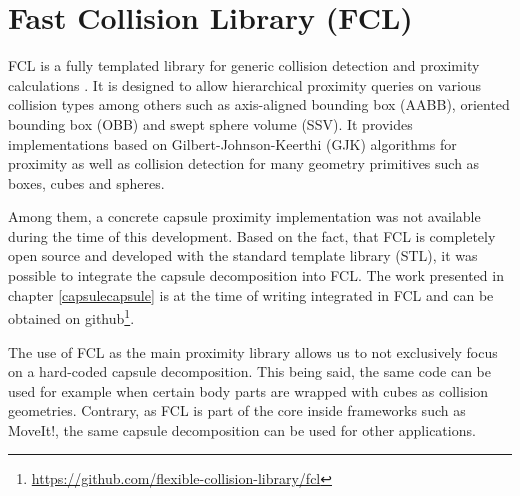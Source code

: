 \section{Fast Collision Library (FCL)}
FCL is a fully templated library for generic collision detection and proximity calculations \cite{conf/icra/PanCM12}. It is designed to allow hierarchical proximity queries on various collision types among others such as axis-aligned bounding box (AABB), oriented bounding box (OBB) and swept sphere volume (SSV). It provides implementations based on Gilbert-Johnson-Keerthi (GJK) \cite{VandenBergen:1999:FRG:334709.334711} \cite{gjkoriginal} algorithms for proximity as well as collision detection for many geometry primitives such as boxes, cubes and spheres. 

Among them, a concrete capsule proximity implementation was not available during the time of this development. Based on the fact, that FCL is completely open source and developed with the standard template library (STL), it was possible to integrate the capsule decomposition into FCL. The work presented in chapter \ref{capsulecapsule} is at the time of writing integrated in FCL and can be obtained on github\footnote{\url{https://github.com/flexible-collision-library/fcl}}. 

The use of FCL as the main proximity library allows us to not exclusively focus on a hard-coded capsule decomposition. This being said, the same code can be used for example when certain body parts are wrapped with cubes as collision geometries. Contrary, as FCL is part of the core inside frameworks such as MoveIt!, the same capsule decomposition can be used for other applications. 
